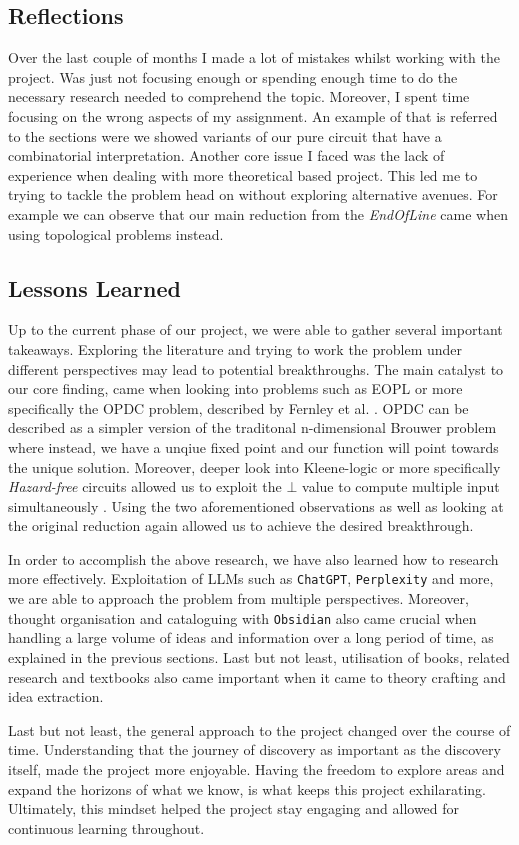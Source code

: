 \subsection{Reflections}

Over the last couple of months I made a lot of mistakes whilst working with the project.
Was just not focusing enough or spending enough time to do the necessary research needed
to comprehend the topic. Moreover, I spent time focusing on the wrong aspects of my assignment.
An example of that is referred to the sections were we showed variants of our pure circuit
that have a combinatorial interpretation. Another core issue I faced was the lack
of experience when dealing with more theoretical based project. This led me to
trying to tackle the problem head on without exploring alternative avenues. For example 
we can observe that our main reduction from the \textit{EndOfLine} came
when using topological problems instead. 

\subsection{Lessons Learned}

Up to the current phase of our project, we were able to gather several important takeaways.
Exploring the literature and trying to work the problem under different perspectives
may lead to potential breakthroughs. The main catalyst to our core finding, came
when looking into problems such as \textsc{EOPL} or more specifically
the \textsc{OPDC} problem, described by Fernley et al. \cite{fearnley_unique_2020}.
\textsc{OPDC} can be described as a simpler version of the traditonal n-dimensional Brouwer problem
where instead, we have a unqiue fixed point and our function will point towards the unique solution.
Moreover, deeper look into Kleene-logic or more specifically \textit{Hazard-free} circuits allowed
us to exploit the $\bot$ value to compute multiple input simultaneously \cite{ikenmeyer_complexity_2019}.
Using the two aforementioned observations as well as looking at the original reduction again allowed us to achieve
the desired breakthrough.

In order to accomplish the above research, we have also learned how to research more effectively.
Exploitation of LLMs such as \texttt{ChatGPT}, \texttt{Perplexity} and more, we are able to
approach the problem from multiple perspectives. Moreover, thought organisation and cataloguing with
\texttt{Obsidian}
also came crucial when handling a large volume of ideas and information over a long period of time,
as explained in the previous sections. Last but not least, utilisation of books,
related research and textbooks also came important when it came to theory crafting and idea extraction.

Last but not least, the general approach to the project changed over the course of time.
Understanding that the journey of discovery as important as the discovery itself,
made the project more enjoyable. Having the freedom to explore areas and expand
the horizons of what we know, is what keeps this project exhilarating.
Ultimately, this mindset helped the project stay engaging and allowed for continuous learning throughout.




